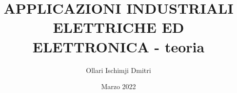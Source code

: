 \documentclass{article}
\begin{document}
    \author{Ollari Ischimji Dmitri}
    \title{APPLICAZIONI INDUSTRIALI ELETTRICHE ED ELETTRONICA - teoria}
    \date{Marzo 2022}

    \maketitle
    \tableofcontents

    \listoffigures
    \listoftables

    
\end{document}
